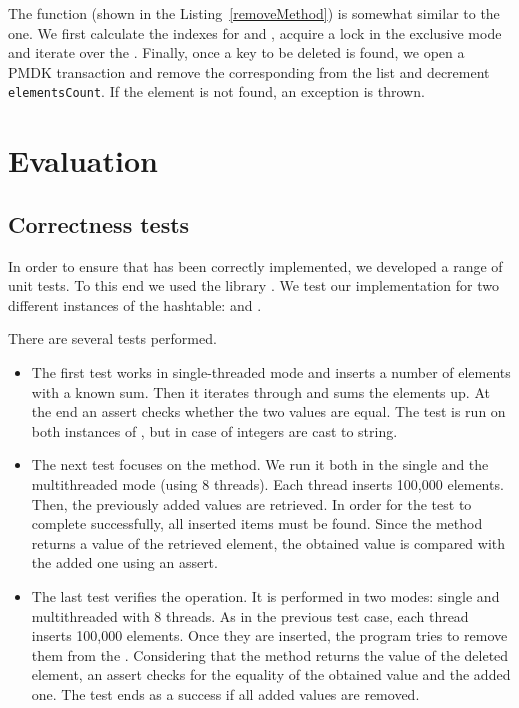         The \removeMethod function (shown in the Listing~\ref{removeMethod}) is somewhat similar to the \insertMethod one. We first calculate the indexes for \internalHashMap and \Segment, acquire a lock in the exclusive mode and iterate over the \Segment. Finally, once a key to be deleted is found, we open a PMDK transaction and remove the corresponding \SegmentObject from the list and decrement \texttt{elementsCount}. If the element is not found, an exception is thrown.

\section{Evaluation}

\subsection{Correctness tests}
 
    In order to ensure that \PHT has been correctly implemented, we developed a range of unit tests. To this end we used the \GoogleTest library \cite{GoogleTest}. 
    We test our implementation for two different instances of the hashtable: \integersMap and \stringsMap.
    
    There are several tests performed.
    \begin{itemize}
    \item The first test works in single-threaded mode and inserts a number of elements with a known sum. 
        Then it iterates through \PHT and sums the elements up. 
        At the end an assert checks whether the two values are equal. 
        The test is run on both instances of \PHT, but in case of \NvmHashMap\stringsMap integers are cast to string.
    \item The next test focuses on the \getMethod method.
        We run it both in the single and the multithreaded mode (using 8 threads). 
        Each thread inserts 100,000 elements. 
        Then, the previously added values are retrieved. 
        In order for the test to complete successfully, all inserted items must be found. 
        Since the \getMethod method returns a value of the retrieved element, the obtained value is compared with the added one using an assert.
    \item The last test verifies the \removeMethod operation. 
        It is performed in two modes: single and multithreaded with 8 threads. 
        As in the previous test case, each thread inserts 100,000 elements. 
        Once they are inserted, the program tries to remove them from the \PHT. 
        Considering that the \removeMethod method returns the value of the deleted element, an assert checks for the equality of the obtained value and the added one. 
        The test ends as a success if all added values are removed.
    \end{itemize}

